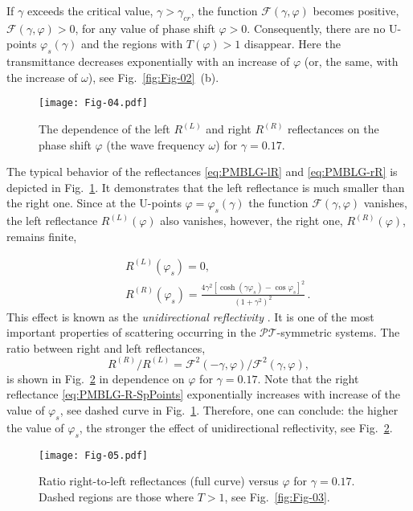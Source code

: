 \documentclass[aps,pra,reprint,showpacs,bibnotes,preprintnumbers,twoside,eqsecnum]{revtex4-1}
\begin{document}
If $\gamma$ exceeds the critical value, $\gamma>\gamma_{cr}$, the function $\mathcal{F}(\gamma,\varphi)$ becomes positive, $\mathcal{F}(\gamma,\varphi)>0$, for any value of phase shift $\varphi>0$. Consequently, there are no U-points $\varphi_s(\gamma)$ and the regions with $T(\varphi)>1$ disappear. Here the transmittance decreases exponentially with an increase of $\varphi$ (or, the same, with the increase of $\omega$), see Fig.~\ref{fig:Fig-02}~(b).
\begin{figure}[!ht]
\centering
\texttt{[image: Fig-04.pdf]}
\caption{The dependence of the left $R^{(L)}$ and right $R^{(R)}$ reflectances on the phase shift $\varphi$ (the wave frequency $\omega$) for $\gamma=0.17$.}\label{fig:Fig-04}
\end{figure}

The typical behavior of the reflectances \eqref{eq:PMBLG-lR} and \eqref{eq:PMBLG-rR} is depicted in Fig.~\ref{fig:Fig-04}. It demonstrates that the left reflectance is much smaller than the right one. Since at the U-points $\varphi=\varphi_s(\gamma)$ the function $\mathcal{F}(\gamma,\varphi)$ vanishes, the left reflectance $R^{(L)}(\varphi)$ also vanishes, however, the right one, $R^{(R)}(\varphi)$, remains finite,

\begin{eqnarray}
&&R^{(L)}(\varphi_s)=0,\nonumber\\
&&R^{(R)}(\varphi_s)=\frac{4\gamma^2[\cosh(\gamma\varphi_s)-\cos\varphi_s]^2}{(1+\gamma^2)^{2}}\,.\label{eq:PMBLG-R-SpPoints}
\end{eqnarray}
This effect is known as the \emph{unidirectional reflectivity} \cite{Lo11}. It is one of the most important properties of scattering occurring in the $\mathcal{P}\mathcal{T}$-symmetric systems. The ratio between right and left reflectances,
%
\begin{equation}\label{eq:PMBLG-Rratio}
R^{(R)}/R^{(L)}=\mathcal{F}^2(-\gamma,\varphi)/\mathcal{F}^2(\gamma,\varphi),
\end{equation}
is shown in Fig.~\ref{fig:Fig-05} in dependence on $\varphi$ for $\gamma=0.17$. Note that the right reflectance \eqref{eq:PMBLG-R-SpPoints} exponentially increases with increase of the value of $\varphi_s$, see dashed curve in Fig.~\ref{fig:Fig-04}. Therefore, one can conclude: the higher the value of $\varphi_s$, the stronger the effect of unidirectional reflectivity, see Fig.~\ref{fig:Fig-05}.
%
\begin{figure}[!ht]
\centering
\texttt{[image: Fig-05.pdf]}
\caption{Ratio right-to-left reflectances (full curve) versus $\varphi$ for $\gamma=0.17$. Dashed regions are those where $T>1$, see  Fig.~\ref{fig:Fig-03}.}\label{fig:Fig-05}
\end{figure}
\end{document}
